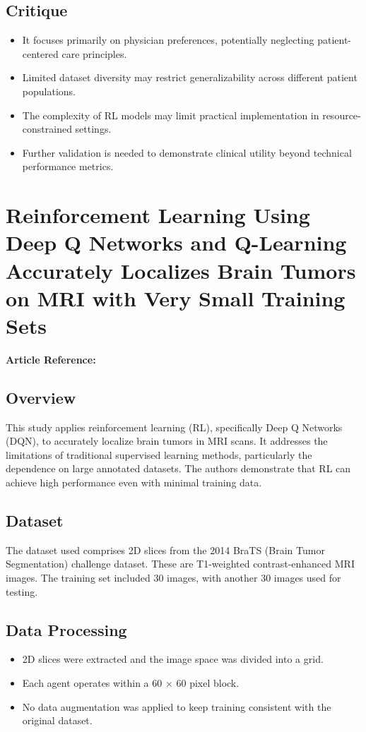 \subsection*{Critique}
\begin{itemize}
    \item It focuses primarily on physician preferences, potentially neglecting patient-centered care principles.
    \item Limited dataset diversity may restrict generalizability across different patient populations.
    \item The complexity of RL models may limit practical implementation in resource-constrained settings.
    \item Further validation is needed to demonstrate clinical utility beyond technical performance metrics.
\end{itemize}

\section{Reinforcement Learning Using Deep Q Networks and Q-Learning Accurately Localizes Brain Tumors on MRI with Very Small Training Sets}
\textbf{Article Reference:} \cite{article_12}

\subsection*{Overview}
This study applies reinforcement learning (RL), specifically Deep Q Networks (DQN), to accurately localize brain tumors in MRI scans. It addresses the limitations of traditional supervised learning methods, particularly the dependence on large annotated datasets. The authors demonstrate that RL can achieve high performance even with minimal training data.

\subsection*{Dataset}
The dataset used comprises 2D slices from the 2014 BraTS (Brain Tumor Segmentation) challenge dataset. These are T1-weighted contrast-enhanced MRI images. The training set included 30 images, with another 30 images used for testing.

\subsection*{Data Processing}
\begin{itemize}
    \item 2D slices were extracted and the image space was divided into a grid.
    \item Each agent operates within a 60 × 60 pixel block.
    \item No data augmentation was applied to keep training consistent with the original dataset.
\end{itemize}


